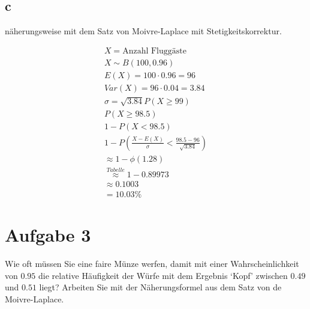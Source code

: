 \subsection{c}

näherungsweise mit dem Satz von Moivre-Laplace mit Stetigkeitskorrektur.

\begin{align*}
    X = \text{Anzahl Fluggäste}                                               \\
    X \sim B(100, 0.96)                                                       \\
    E(X) = 100 \cdot 0.96 = 96                                                \\
    Var(X) = 96 \cdot 0.04 = 3.84                                             \\
    \sigma = \sqrt{3.84}
    P(X \geq 99)                                                              \\
    P(X \geq 98.5)                                                            \\
    1 - P(X < 98.5)                                                           \\
    1 - P\left(\frac{X - E(X)}{\sigma} < \frac{98.5 - 96}{\sqrt{3.84}}\right) \\
    \approx 1 - \phi(1.28)                                                    \\
    \overset{Tabelle}{\approx} 1 - 0.89973                                    \\
    \approx 0.1003                                                            \\
    = 10.03 \%
\end{align*}

\section{Aufgabe 3}

Wie oft müssen Sie eine faire Münze werfen, damit mit einer Wahrscheinlichkeit
von $0.95$ die relative Häufigkeit der Würfe mit dem Ergebnis `Kopf' zwischen
$0.49$ und $0.51$ liegt? Arbeiten Sie mit der Näherungsformel aus dem Satz von
de Moivre-Laplace.

